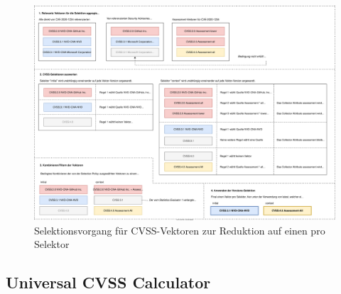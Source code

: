 \begin{figure}[htbp] %
    \centering
    \includegraphics[width=1\textwidth, keepaspectratio]{res/grafiken/cvss-selection-process-selection}
    \caption{Selektionsvorgang für CVSS-Vektoren zur Reduktion auf einen pro Selektor}
    \label{fig:cvss-selection-process-selection}
\end{figure}

\subsection{Universal CVSS Calculator} \label{subsec:projektbericht-loesungsweg-typescript-cvss-online-calculator}
